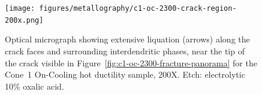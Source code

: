 {\begin{figure}
    \centering
    \texttt{[image: figures/metallography/c1-oc-2300-crack-region-200x.png]}
    \caption[]{Optical micrograph showing extensive liquation (arrows) along the crack faces and surrounding interdendritic phases, near the tip of the crack visible in Figure~\ref{fig:c1-oc-2300-fracture-panorama} for the Cone~1 On-Cooling \protect{} hot ductility sample, 200X. Etch: electrolytic 10\% oxalic acid.}
    \label{fig:c1-oc-2300-crack-region-200x}
\end{figure}

\begin{figure}
    \centering
     \\

\end{figure}}
